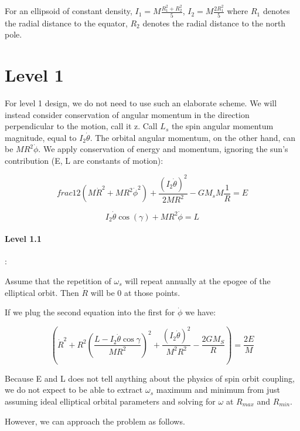 \documentclass[12pt]{article}
\begin{document}
For an ellipsoid of constant density, $I_1 = M \frac{R_1^2 + R_2^2}{5}$, $I_2 = M \frac{2R_1^2}{5}$  where $R_1$ denotes the radial distance to the equator, $R_2$ denotes the radial distance to  the north pole.

\section{Level 1}

For level 1 design, we do not need to use such an elaborate scheme.  We will instead consider conservation of angular momentum in the direction perpendicular to the motion, call it z.  Call $L_s$ the spin angular momentum magnitude, equal to $I_2 \dot{\theta}$.  The orbital angular momentum, on the other hand, can be $ MR^2 \dot{\phi}$.  We apply conservation of energy and momentum, ignoring the sun's contribution (E, L are constants of motion):

\begin{equation}
    frac{1}{2}(M\dot{R}^2 + MR^2 \dot{\phi}^2)+ \frac{(I_2 \dot{\theta})^2}{2 M R^2}  - GM_s M \frac{1}{R}= E
\end{equation}

\begin{equation}
    I_2 \dot{\theta} \cos(\gamma) + MR^2 \dot{\phi} = L
\end{equation}

\paragraph{Level 1.1}:

Assume that the repetition of $\omega_s$ will repeat annually at the epogee of the elliptical orbit.  
Then $\dot{R}$ will be 0 at those points.

If we plug the second equation into the first for $\dot{\phi}$ we have:

\begin{equation}
    \left(\dot{R}^2 + R^2 (\frac{L- I_2 \dot{\theta} \cos{\gamma}}{MR^2})^2+ \frac{(I_2 \dot{\theta})^2}{M^2 R^2}  - \frac{2GM_S}{R}\right) = \frac{2E}{M}
\end{equation}

Because E and L does not tell anything about the physics of spin orbit coupling, we do not expect to be able to extract $\omega_s$ maximum and minimum from just assuming ideal elliptical orbital parameters and solving for $\omega$ at $R_{max}$ and $R_{min}$. 

However, we can approach the problem as follows.  
\end{document}
